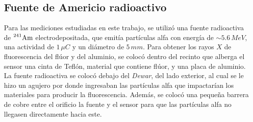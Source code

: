 \subsection{Fuente de Americio radioactivo}
\noindent Para las mediciones estudiadas en este trabajo, se utilizó una fuente radioactiva de $\prescript{241}{}{\mbox{Am}}$ electrodepositada, que emitía partículas alfa con energía de $\sim 5.6\,\si{MeV}$, una actividad de $1\,\si{\mu C}$ y un diámetro de $5\,\si{mm}$. Para obtener los rayos $X$ de fluorescencia del flúor y del aluminio, se colocó dentro del recinto que alberga el sensor una cinta de Teflón, material que contiene flúor, y una placa de aluminio. La fuente radioactiva se colocó debajo del \textit{Dewar}, del lado exterior, al cual se le hizo un agujero por donde ingresaban las partículas alfa que impactarían los materiales para producir la fluorescencia. Además, se colocó una pequeña barrera de cobre entre el orificio la fuente y el sensor para que las partículas alfa no llegasen directamente hacia este.\\
